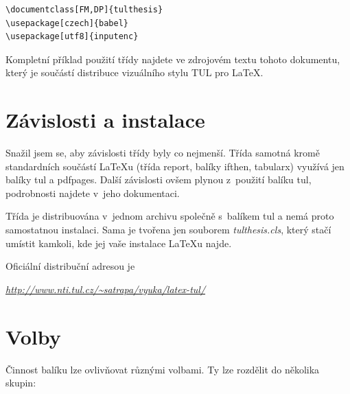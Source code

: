 \documentclass[FZS,DP,EN]{tulthesis}
\newcommand{\argument}[1]{{\ttfamily\color{\tulcolor}#1}}
\newenvironment{myquote}{\begin{list}{}{\setlength\leftmargin\parindent}\item[]}{\end{list}}
\newenvironment{listing}{\begin{myquote}\color{\tulcolor}}{\end{myquote}}
\begin{document}
\begin{listing}
\begin{verbatim}
\documentclass[FM,DP]{tulthesis}
\usepackage[czech]{babel}
\usepackage[utf8]{inputenc}
\end{verbatim}
\end{listing}

Kompletní příklad použití třídy najdete ve zdrojovém textu tohoto dokumentu,
který je součástí distribuce vizuálního stylu TUL pro \LaTeX.


\chapter{Závislosti a instalace}

Snažil jsem se, aby závislosti třídy byly co nejmenší. Třída samotná kromě
standardních součástí \LaTeX u (třída \argument{report}, balíky
\argument{ifthen}, \argument{tabularx}) využívá jen balíky \argument{tul} a
\argument{pdfpages}. Další závislosti ovšem plynou z~použití balíku
\argument{tul}, podrobnosti najdete v~jeho dokumentaci.

Třída je distribuována v~jednom archivu společně s~balíkem \argument{tul} a
nemá proto samostatnou instalaci. Sama je tvořena jen souborem
\emph{tulthesis.cls}, který stačí umístit kamkoli, kde jej vaše instalace
\LaTeX u najde. 

Oficiální distribuční adresou je

\begin{listing}
\href{http://www.nti.tul.cz/~satrapa/vyuka/latex-tul/}{\emph{http://www.nti.tul.cz/\textasciitilde satrapa/vyuka/latex-tul/}}
\end{listing}


\chapter{Volby}\label{volby}

Činnost balíku lze ovlivňovat různými volbami. Ty lze rozdělit do několika
skupin:
\end{document}
